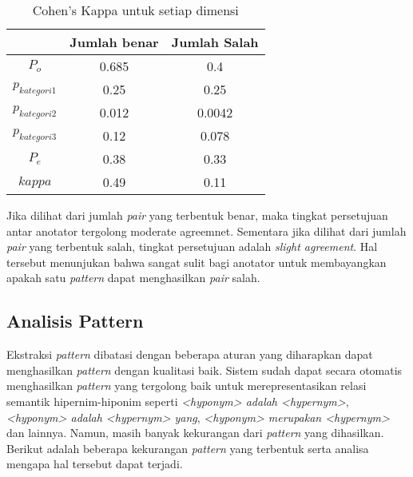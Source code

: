 \begin{table}
  \centering
  \caption{Cohen's Kappa untuk setiap dimensi}
  \label{table:p-kappa}
  \begin{tabular}{|c|c|c|}
  \hline
  & Jumlah benar & Jumlah Salah \\ \hline
  $P_o$ & 0.685 & 0.4 \\ \hline
  $p_{kategori1}$ & 0.25 & 0.25 \\ \hline
  $p_{kategori2}$ & 0.012 & 0.0042 \\ \hline
  $p_{kategori3}$ & 0.12 & 0.078 \\ \hline
  $P_e$ & 0.38 & 0.33 \\ \hline
  $kappa$ & 0.49 & 0.11 \\ \hline 
  \end{tabular} 
\end{table}

Jika dilihat dari jumlah \textit{pair} yang terbentuk benar, maka tingkat persetujuan antar anotator tergolong {moderate agreemnet}. Sementara jika dilihat dari jumlah \textit{pair} yang terbentuk salah, tingkat persetujuan adalah \textit{slight agreement}. Hal tersebut menunjukan bahwa sangat sulit bagi anotator untuk membayangkan apakah satu \textit{pattern} dapat menghasilkan \textit{pair} salah.

\subsection{Analisis Pattern}
Ekstraksi \textit{pattern} dibatasi dengan beberapa aturan yang diharapkan dapat menghasilkan \textit{pattern} dengan kualitasi baik. Sistem sudah dapat secara otomatis menghasilkan \textit{pattern} yang tergolong baik untuk merepresentasikan relasi semantik hipernim-hiponim seperti \textit{<hyponym> adalah <hypernym>}, \textit{<hyponym> adalah <hypernym> yang}, \textit{<hyponym> merupakan <hypernym>} dan lainnya. Namun, masih banyak kekurangan dari \textit{pattern} yang dihasilkan. Berikut adalah beberapa kekurangan \textit{pattern} yang terbentuk serta analisa mengapa hal tersebut dapat terjadi.

